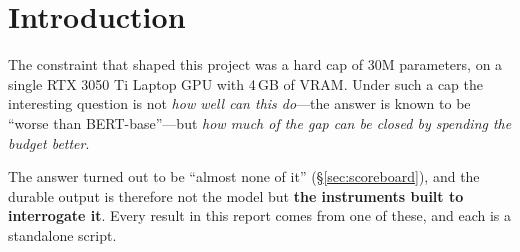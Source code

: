 \documentclass[11pt,a4paper]{article}
\newcommand{\nats}[1]{\ensuremath{#1}\,nats}
\begin{document}
\begin{abstract}
\begin{enumerate}[leftmargin=1.4em,itemsep=4pt]
\item \textbf{MLM loss and downstream accuracy decoupled completely at this scale.} A
\nats{-0.435} held-out improvement ($\approx$9$\times$ eval noise, unambiguously real) moved
SST-2 by \textbf{0.0\,pp}. The spread across three very different pretraining regimes is
\textbf{1.1\,SE}, and the two SST-2 harnesses disagree with each other by more than any
intervention moved the number. (\S\ref{sec:scoreboard})
\end{enumerate}

\noindent
Also reported: a sixth layer with no work to do under three independent initialisations; a
\emph{negative} pairwise ablation marginal---removing a useless layer halves the measured cost
of removing a useful one; an induction circuit installed into a masked LM, taking
copy-from-context from 0.8\% to 93\% in 6.5 minutes; span masking that improved the harder task
more than the easier one; and an 11$\times$ effect of annealing \emph{corpus} over annealing
\emph{schedule}. Total cost: \textbf{35.4 GPU-hours}, $\approx$3.0B tokens processed.
\end{abstract}

\tableofcontents
\vspace{1em}

\section{Introduction}

The constraint that shaped this project was a hard cap of 30M parameters, on a single RTX
3050 Ti Laptop GPU with 4\,GB of VRAM. Under such a cap the interesting question is not
\emph{how well can this do}---the answer is known to be ``worse than BERT-base''---but
\emph{how much of the gap can be closed by spending the budget better}.

The answer turned out to be ``almost none of it'' (\S\ref{sec:scoreboard}), and the durable
output is therefore not the model but \textbf{the instruments built to interrogate it}. Every
result in this report comes from one of these, and each is a standalone script.
\end{document}
